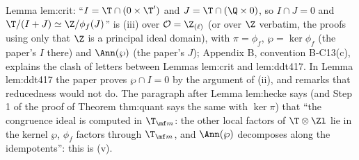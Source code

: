 \begin{paperlink}\label{pl:modules:congruence-ideal}
Lemma lem:crit: ``$I=\T\cap(0\times\T')$ and $J=\T\cap(\Q\times0)$, so $I\cap J=0$ and $\T/(I+J)\simeq\Z/\phi_f(J)$'' is (iii) over $\mathcal O=\Z_{(\ell)}$
(or over $\Z$ verbatim, the proofs using only that $\Z$ is a principal ideal domain), with $\pi=\phi_f$, $\wp=\ker\phi_f$ (the paper's $I$ there) and $\Ann(\wp)$ (the paper's
$J$); Appendix B, convention B-C13(c), explains the clash of letters between Lemmas lem:crit and lem:ddt417. In Lemma lem:ddt417 the paper proves $\wp\cap I=0$ by
the argument of (ii), and remarks that reducedness would not do. The paragraph after Lemma lem:hecke says (and Step 1 of the proof of Theorem thm:quant
says the same with $\ker\pi$) that ``the congruence ideal is computed in $\T_{\mf m}$: the other local factors of $\T\otimes\Zl$ lie in the kernel $\wp$, $\phi_f$ factors through $\T_{\mf m}$, and $\Ann(\wp)$
decomposes along the idempotents'': this is (v).
\end{paperlink}

